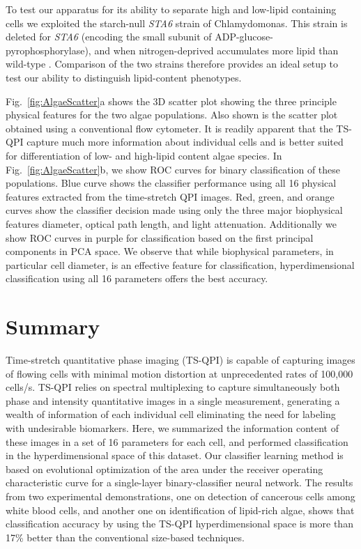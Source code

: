 \documentclass[aps,pra,reprint,superscriptaddress]{revtex4-1}
\begin{document}
To test our apparatus for its ability to separate high and low-lipid containing cells we exploited the starch-null \textit{STA6} strain of Chlamydomonas. This strain is deleted for \textit{STA6} \cite{zabawinski2001starchless} (encoding the small subunit of ADP-glucose-pyrophosphorylase), and when nitrogen-deprived accumulates more lipid than wild-type \cite{work2010increased, li2010chlamydomonas, goodenough2014path, blaby2013systems}. Comparison of the two strains therefore provides an ideal setup to test our ability to distinguish lipid-content phenotypes.

Fig.~\ref{fig:AlgaeScatter}a shows the 3D scatter plot showing the three principle physical features for the two algae populations. Also shown is the scatter plot obtained using a conventional flow cytometer. It is readily apparent that the TS-QPI capture much more information about individual cells and is better suited for differentiation of low- and high-lipid content algae species. In Fig.~\ref{fig:AlgaeScatter}b, we show ROC curves for binary classification of these populations. Blue curve shows the classifier performance using all 16 physical features extracted from the time-stretch QPI images. Red, green, and orange curves show the classifier decision made using only the three major biophysical features diameter, optical path length, and light attenuation. Additionally we show ROC curves in purple for classification based on the first principal components in PCA space. We observe that while biophysical parameters, in particular cell diameter, is an effective feature for classification, hyperdimensional classification using all 16 parameters offers the best accuracy. 


\section{Summary}

Time-stretch quantitative phase imaging (TS-QPI) is capable of capturing images of flowing cells with minimal motion distortion at unprecedented rates of 100,000 cells/s. TS-QPI relies on spectral multiplexing to capture simultaneously both phase and intensity quantitative images in a single measurement, generating a wealth of information of each individual cell eliminating the need for labeling with undesirable biomarkers. Here, we summarized the information content of these images in a set of 16 parameters for each cell, and performed classification in the hyperdimensional space of this dataset. Our classifier learning method is based on evolutional optimization of the area under the receiver operating characteristic curve for a single-layer binary-classifier neural network. The results from two experimental demonstrations, one on detection of cancerous cells among white blood cells, and another one on identification of lipid-rich algae, shows that classification accuracy by using the TS-QPI hyperdimensional space is more than 17\% better than the conventional size-based techniques.
\end{document}
